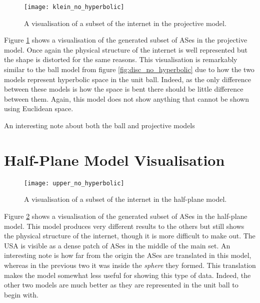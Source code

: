 \begin{figure}
	\label{fig:klein_no_hyperbolic}
	\centering
	\texttt{[image: klein\_no\_hyperbolic]}
	\caption{A visualisation of a subset of the internet in the projective model.}
\end{figure}

Figure \ref{fig:klein_no_hyperbolic} shows a visualisation of the generated subset of ASes in the projective model. Once again the physical structure of the internet is well represented but the shape is distorted for the same reasons. This visualisation is remarkably similar to the ball model from figure \ref{fig:disc_no_hyperbolic} due to how the two models represent hyperbolic space in the unit ball. Indeed, as the only difference between these models is how the space is bent there should be little difference between them. Again, this model does not show anything that cannot be shown using Euclidean space.

An interesting note about both the ball and projective models 

\section{Half-Plane Model Visualisation}

\begin{figure}
	\label{fig:upper_no_hyperbolic}
	\centering
	\texttt{[image: upper\_no\_hyperbolic]}
	\caption{A visualisation of a subset of the internet in the half-plane model.}
\end{figure}

Figure \ref{fig:upper_no_hyperbolic} shows a visualisation of the generated subset of ASes in the half-plane model. This model produces very different results to the others but still shows the physical structure of the internet, though it is more difficult to make out. The USA is visible as a dense patch of ASes in the middle of the main set. An interesting note is how far from the origin the ASes are translated in this model, whereas in the previous two it was inside the \textit{sphere} they formed. This translation makes the model somewhat less useful for showing this type of data. Indeed, the other two models are much better as they are represented in the unit ball to begin with.

